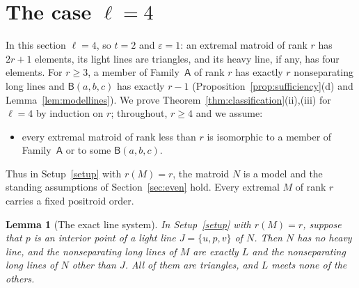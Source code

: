 \documentclass[11pt]{amsart}
\newtheorem{lemma}[theorem]{Lemma}
\theoremstyle{definition}
\theoremstyle{remark}
\numberwithin{equation}{section}
\newcommand{\FA}{\mathsf{A}}
\newcommand{\FB}{\mathsf{B}}
\begin{document}
\section{The case $\ell=4$}\label{sec:four}

In this section $\ell=4$, so $t=2$ and $\varepsilon=1$: an extremal matroid of rank $r$ has $2r+1$ elements, its light lines are triangles, and its heavy line, if any, has four elements. For $r\ge3$, a member of Family~$\FA$ of rank $r$ has exactly $r$ nonseparating long lines and $\FB(a,b,c)$ has exactly $r-1$ (Proposition~\ref{prop:sufficiency}(d) and Lemma~\ref{lem:modellines}). We prove Theorem~\ref{thm:classification}(ii),(iii) for $\ell=4$ by induction on $r$; throughout, $r\ge4$ and we assume:
\begin{itemize}[leftmargin=2em]
\item[(IH)] every extremal matroid of rank less than $r$ is isomorphic to a member of Family~$\FA$ or to some $\FB(a,b,c)$.
\end{itemize}
Thus in Setup~\ref{setup} with $r(M)=r$, the matroid $N$ is a model and the standing assumptions of Section~\ref{sec:even} hold. Every extremal $M$ of rank $r$ carries a fixed positroid order.

\begin{lemma}[The exact line system]\label{lem:exact}
In Setup~\textup{\ref{setup}} with $r(M)=r$, suppose that $p$ is an interior point of a light line $J=\{u,p,v\}$ of $N$. Then $N$ has no heavy line, and the nonseparating long lines of $M$ are exactly $L$ and the nonseparating long lines of $N$ other than $J$. All of them are triangles, and $L$ meets none of the others.
\end{lemma}
\end{document}
